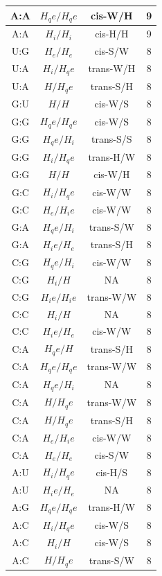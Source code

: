 \begin{center}
\begin{longtable}{c|c|c|c}
A:A & $H_qe/H_qe$ & cis-W/H & 9 \\  \hline
A:A & $H_i/H_i$ & cis-H/H & 9 \\  \hline
U:G & $H_e/H_e$ & cis-S/W & 8 \\  \hline
U:A & $H_i/H_qe$ & trans-W/H & 8 \\  \hline
U:A & $H/H_qe$ & trans-S/H & 8 \\  \hline
G:U & $H/H$ & cis-W/S & 8 \\  \hline
G:G & $H_qe/H_qe$ & cis-W/S & 8 \\  \hline
G:G & $H_qe/H_i$ & trans-S/S & 8 \\  \hline
G:G & $H_i/H_qe$ & trans-H/W & 8 \\  \hline
G:G & $H/H$ & cis-W/H & 8 \\  \hline
G:C & $H_i/H_qe$ & cis-W/W & 8 \\  \hline
G:C & $H_e/H_ie$ & cis-W/W & 8 \\  \hline
G:A & $H_qe/H_i$ & trans-S/W & 8 \\  \hline
G:A & $H_ie/H_e$ & trans-S/H & 8 \\  \hline
C:G & $H_qe/H_i$ & cis-W/W & 8 \\  \hline
C:G & $H_i/H$ & NA & 8 \\  \hline
C:G & $H_ie/H_ie$ & trans-W/W & 8 \\  \hline
C:C & $H_i/H$ & NA & 8 \\  \hline
C:C & $H_ie/H_e$ & cis-W/W & 8 \\  \hline
C:A & $H_qe/H$ & trans-S/H & 8 \\  \hline
C:A & $H_qe/H_qe$ & trans-W/W & 8 \\  \hline
C:A & $H_qe/H_i$ & NA & 8 \\  \hline
C:A & $H/H_qe$ & trans-W/W & 8 \\  \hline
C:A & $H/H_qe$ & trans-S/H & 8 \\  \hline
C:A & $H_e/H_ie$ & cis-W/W & 8 \\  \hline
C:A & $H_e/H_e$ & cis-S/W & 8 \\  \hline
A:U & $H_i/H_qe$ & cis-H/S & 8 \\  \hline
A:U & $H_ie/H_e$ & NA & 8 \\  \hline
A:G & $H_qe/H_qe$ & trans-H/W & 8 \\  \hline
A:C & $H_i/H_qe$ & cis-W/S & 8 \\  \hline
A:C & $H_i/H$ & cis-W/S & 8 \\  \hline
A:C & $H/H_qe$ & trans-S/W & 8 \\  \hline

\end{longtable}
\end{center}
